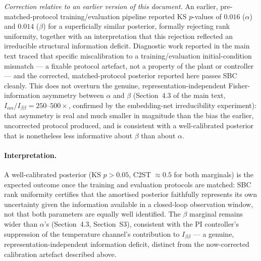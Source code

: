 \documentclass[aps,pre,twocolumn,superscriptaddress]{revtex4-2}
\begin{document}
\textit{Correction relative to an earlier version of this document.} An earlier,
pre-matched-protocol training/evaluation pipeline reported KS $p$-values of $0.016$
($\alpha$) and $0.014$ ($\beta$) for a superficially similar posterior, formally
rejecting rank uniformity, together with an interpretation that this rejection
reflected an irreducible structural information deficit. Diagnostic work reported in
the main text traced that specific miscalibration to a training/evaluation
initial-condition mismatch --- a fixable protocol artefact, not a property of the
plant or controller --- and the corrected, matched-protocol posterior reported here
passes SBC cleanly. This does not overturn the genuine, representation-independent
Fisher-information asymmetry between $\alpha$ and $\beta$ (Section~4.3 of the main
text, $I_{\alpha\alpha}/I_{\beta\beta}=250$--$500\times$, confirmed by the
embedding-net irreducibility experiment): that asymmetry is real and much smaller in
magnitude than the bias the earlier, uncorrected protocol produced, and is consistent
with a well-calibrated posterior that is nonetheless less informative about $\beta$
than about $\alpha$.

\paragraph{Interpretation.}
A well-calibrated posterior (KS $p>0.05$, C2ST $\approx 0.5$ for both marginals) is
the expected outcome once the training and evaluation protocols are matched: SBC
rank uniformity certifies that the amortised posterior faithfully represents its own
uncertainty given the information available in a closed-loop observation window, not
that both parameters are equally well identified. The $\beta$ marginal remains wider
than $\alpha$'s (Section~4.3, Section~S3), consistent with the PI controller's
suppression of the temperature channel's contribution to $I_{\beta\beta}$ --- a
genuine, representation-independent information deficit, distinct from the
now-corrected calibration artefact described above.
\end{document}
